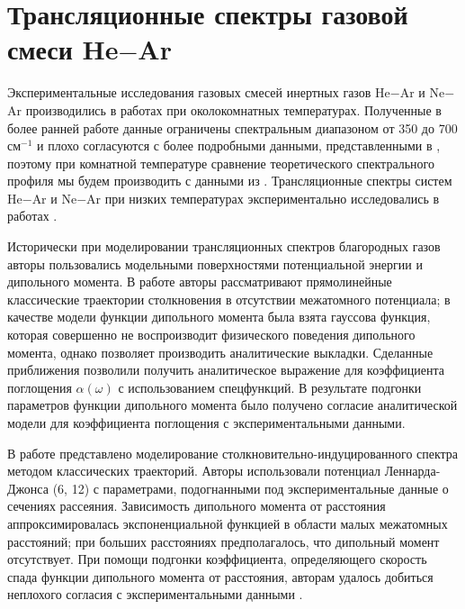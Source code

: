 \section{Трансляционные спектры газовой смеси He$-$Ar}

Экспериментальные исследования газовых смесей инертных газов He$-$Ar и Ne$-$Ar производились в работах \cite{bosomworth1965_part1, bosomworth1965_part2} при околокомнатных температурах. Полученные в более ранней работе \cite{kiss1959} данные ограничены спектральным диапазоном от 350 до 700 см$^{-1}$ и плохо согласуются с более подробными данными, представленными в \cite{bosomworth1965_part2}, поэтому при комнатной температуре сравнение теоретического спектрального профиля мы будем производить с данными из \cite{bosomworth1965_part2}. Трансляционные спектры систем He$-$Ar и Ne$-$Ar при низких температурах экспериментально исследовались в работах \cite{bukhtoyarova1977, bukhtoyarova1977_2, ryzhov1974}. \par 
Исторически при моделировании трансляционных спектров благородных газов авторы пользовались модельными поверхностями потенциальной энергии и дипольного момента. В работе \cite{levine1967} авторы рассматривают прямолинейные классические траектории столкновения в отсутствии межатомного потенциала; в качестве модели функции дипольного момента была взята гауссова функция, которая совершенно не воспроизводит физического поведения дипольного момента, однако позволяет производить аналитические выкладки. Сделанные приближения позволили получить аналитическое выражение для коэффициента поглощения $\alpha(\omega)$ с использованием спецфункций. В результате подгонки параметров функции дипольного момента было получено согласие аналитической модели для коэффициента поглощения с экспериментальными данными. \par
В работе \cite{mcquarrie1968} представлено моделирование столкновительно-индуцированного спектра методом классических траекторий. Авторы использовали потенциал Леннарда-Джонса (6, 12) с параметрами, подогнанными под экспериментальные данные о сечениях рассеяния. Зависимость дипольного момента от расстояния аппроксимировалась экспоненциальной функцией в области малых межатомных расстояний; при больших расстояниях предполагалось, что дипольный момент отсутствует. При помощи подгонки коэффициента, определяющего скорость спада функции дипольного момента от расстояния, авторам удалось добиться неплохого согласия с экспериментальными данными \cite{bosomworth1965_part2}. \par
